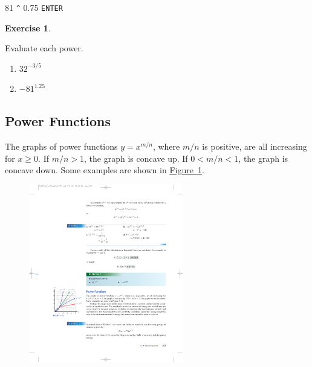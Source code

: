 \documentclass[10pt,]{book}
\theoremstyle{plain}
\theoremstyle{definition}
\theoremstyle{definition}
\theoremstyle{definition}
\theoremstyle{definition}
\theoremstyle{definition}
\newtheorem{exercise}[theorem]{Exercise}
\numberwithin{equation}{section}
\newcommand{\lt}{ < }
\newcommand{\gt}{ > }
\begin{document}
    81 \lstinline?^? 0.75 \lstinline?ENTER?
%
\begin{exercise}\label{exercise-evaluate-rational-exponent}

    Evaluate each power.
    \leavevmode%
\begin{enumerate}[label=*\alph**]
\item\hypertarget{li-525}{}\( 32^{−3/5}\)\item\hypertarget{li-526}{}\( −81^{1.25}\)\end{enumerate}
\end{exercise}
\typeout{************************************************}
\typeout{************************************************}
\subsection[Power Functions]{Power Functions}\label{subsection-76}
\index{}
    The graphs of power functions \(y = x^{m/n}\), where \(m/n\) is positive, are all increasing for \(x\ge 0\). If \(m/n \gt 1\), the graph is concave up. If \(0 \lt m/n \lt 1\), the graph is concave down. Some examples are shown in \hyperref[fig-power-functions]{Figure~\ref{fig-power-functions}}.
%
\leavevmode%
\begin{figure}
\centering
\includegraphics[width=0.60\textwidth,]{images/fig-power-functions.pdf}\caption{\label{fig-power-functions}}
\end{figure}
\par
\end{document}

